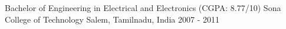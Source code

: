 

\begin{cventries}

  \cventry
    {Bachelor of Engineering in Electrical and Electronics (CGPA: 8.77/10)} %
    {Sona College of Technology} %
    {Salem, Tamilnadu, India} %
    {2007 - 2011} %
    {}
\end{cventries}
